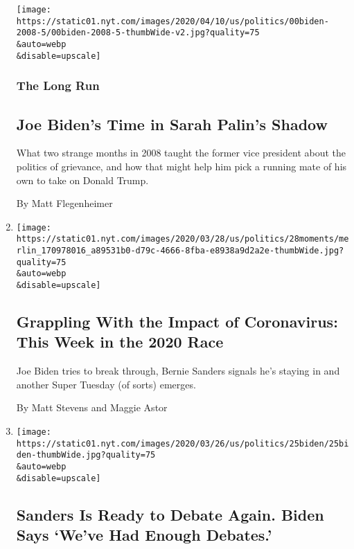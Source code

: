 \begin{enumerate}
  \texttt{[image: https://static01.nyt.com/images/2020/04/10/us/politics/00biden-2008-5/00biden-2008-5-thumbWide-v2.jpg?quality=75\\\&auto=webp\\\&disable=upscale]}

  \hypertarget{the-long-run}{%
  \subsubsection{The Long Run}\label{the-long-run}}

  \hypertarget{joe-bidens-time-in-sarah-palins-shadow}{%
  \subsection{Joe Biden's Time in Sarah Palin's
  Shadow}\label{joe-bidens-time-in-sarah-palins-shadow}}

  What two strange months in 2008 taught the former vice president about
  the politics of grievance, and how that might help him pick a running
  mate of his own to take on Donald Trump.

  By Matt Flegenheimer
\item
  \href{/2020/03/28/us/politics/coronavirus-biden-trump-sanders.html}{}

  \texttt{[image: https://static01.nyt.com/images/2020/03/28/us/politics/28moments/merlin\_170978016\_a89531b0-d79c-4666-8fba-e8938a9d2a2e-thumbWide.jpg?quality=75\\\&auto=webp\\\&disable=upscale]}

  \hypertarget{grappling-with-the-impact-of-coronavirus-this-week-in-the-2020-race}{%
  \subsection{Grappling With the Impact of Coronavirus: This Week in the
  2020
  Race}\label{grappling-with-the-impact-of-coronavirus-this-week-in-the-2020-race}}

  Joe Biden tries to break through, Bernie Sanders signals he's staying
  in and another Super Tuesday (of sorts) emerges.

  By Matt Stevens and Maggie Astor
\item
  \href{/2020/03/25/us/politics/bernie-sanders-joe-biden-next-debate.html}{}

  \texttt{[image: https://static01.nyt.com/images/2020/03/26/us/politics/25biden/25biden-thumbWide.jpg?quality=75\\\&auto=webp\\\&disable=upscale]}

  \hypertarget{sanders-is-ready-to-debate-again-biden-says-weve-had-enough-debates}{%
  \subsection{Sanders Is Ready to Debate Again. Biden Says `We've Had
  Enough
  Debates.'}\label{sanders-is-ready-to-debate-again-biden-says-weve-had-enough-debates}}


\end{enumerate}
